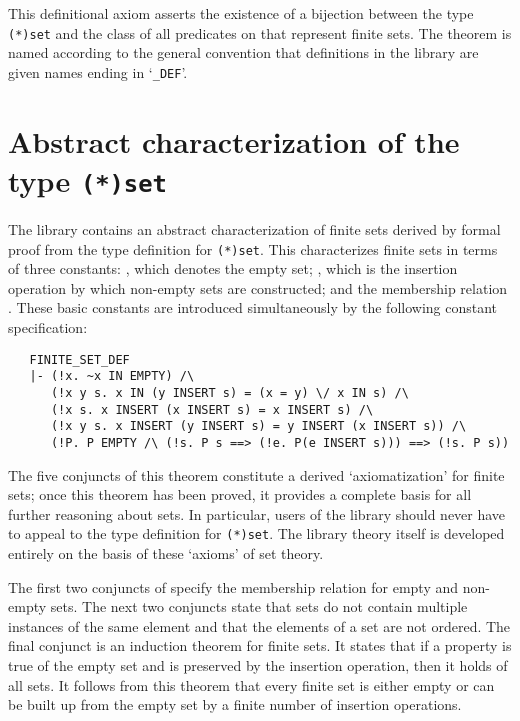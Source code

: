 \noindent This definitional axiom asserts the existence of a bijection 
between the type {\small\verb!(*)set!} and the class of all predicates on
\ml{*} that represent finite sets.  The theorem  is named according to the general
convention that definitions in the  library are given names
ending in `{\small\verb!_DEF!}'.%

\section{Abstract characterization of the type
{\tt (*)set}}

The  library contains an abstract characterization of finite
sets derived by formal proof from the type definition for
{\small\verb!(*)set!}.  This characterizes finite sets in terms of three
constants: , which denotes the empty set; , which is the
insertion operation by which non-empty sets are constructed; and the membership
relation .  These basic constants are introduced simultaneously by the
following constant specification:

\begin{hol}
\begin{verbatim}
   FINITE_SET_DEF
   |- (!x. ~x IN EMPTY) /\
      (!x y s. x IN (y INSERT s) = (x = y) \/ x IN s) /\
      (!x s. x INSERT (x INSERT s) = x INSERT s) /\
      (!x y s. x INSERT (y INSERT s) = y INSERT (x INSERT s)) /\
      (!P. P EMPTY /\ (!s. P s ==> (!e. P(e INSERT s))) ==> (!s. P s))
\end{verbatim}\end{hol}

\noindent The five conjuncts of this theorem constitute a derived
`axiomatization' for finite sets; once this theorem has been proved, it
provides a complete basis for all further reasoning about sets.  In particular,
users of the library should never have to appeal to the type definition for
{\small\verb!(*)set!}. The library theory \ml{finite\_sets} itself is developed
entirely on the basis of these `axioms' of set theory.

The first two conjuncts of \ml{FINITE\_SET\_DEF} specify the membership
relation \ml{IN} for empty and non-empty sets.  The next two conjuncts state
that sets do not contain multiple instances of the same element and that the
elements of a set are not ordered.  The final conjunct is an
induction\index{induction} theorem for finite sets.  It states that if a
property is true of the empty set and is preserved by the insertion operation,
then it holds of all sets.  It follows from this theorem that every finite set
is either empty or can be built up from the empty set by a finite number of
insertion operations.


